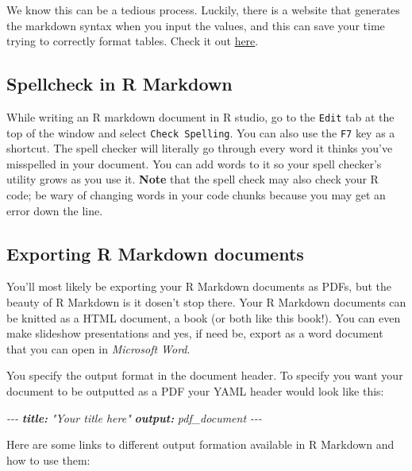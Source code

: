 \documentclass[
]{book}
\newenvironment{Shaded}{\begin{snugshade}}{\end{snugshade}}
\newcommand{\AnnotationTok}[1]{\textcolor[rgb]{0.56,0.35,0.01}{\textbf{\textit{#1}}}}
\newcommand{\CommentTok}[1]{\textcolor[rgb]{0.56,0.35,0.01}{\textit{#1}}}
\begin{document}
We know this can be a tedious process. Luckily, there is a website that generates the markdown syntax when you input the values, and this can save your time trying to correctly format tables. Check it out \href{https://www.tablesgenerator.com/markdown_tables}{here}.

\hypertarget{spellcheck-in-r-markdown}{%
\subsection{Spellcheck in R Markdown}\label{spellcheck-in-r-markdown}}

While writing an R markdown document in R studio, go to the \texttt{Edit} tab at the top of the window and select \texttt{Check\ Spelling}. You can also use the \texttt{F7} key as a shortcut. The spell checker will literally go through every word it thinks you've misspelled in your document. You can add words to it so your spell checker's utility grows as you use it. \textbf{Note} that the spell check may also check your R code; be wary of changing words in your code chunks because you may get an error down the line.

\hypertarget{exporting-r-markdown-documents}{%
\subsection{Exporting R Markdown documents}\label{exporting-r-markdown-documents}}

You'll most likely be exporting your R Markdown documents as PDFs, but the beauty of R Markdown is it dosen't stop there. Your R Markdown documents can be knitted as a HTML document, a book (or both like this book!). You can even make slideshow presentations and yes, if need be, export as a word document that you can open in \emph{Microsoft Word}.

You specify the output format in the document header. To specify you want your document to be outputted as a PDF your YAML header would look like this:

\begin{Shaded}
\begin{Highlighting}[]
\CommentTok{{-}{-}{-}}
\AnnotationTok{title:}\CommentTok{ "Your title here"}
\AnnotationTok{output:}\CommentTok{ pdf\_document}
\CommentTok{{-}{-}{-}}
\end{Highlighting}
\end{Shaded}

Here are some links to different output formation available in R Markdown and how to use them:
\end{document}
